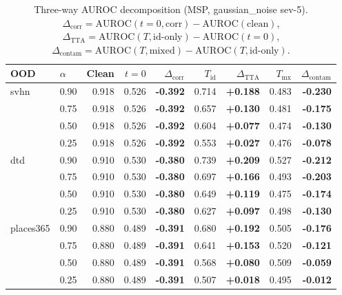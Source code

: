 \begin{table}[t]
\centering
\small
\caption{Three-way AUROC decomposition (MSP, gaussian\_noise sev-5). $\Delta_\text{corr}=\text{AUROC}(t{=}0,\text{corr})-\text{AUROC}(\text{clean})$, $\Delta_\text{TTA}=\text{AUROC}(T,\text{id-only})-\text{AUROC}(t{=}0)$, $\Delta_\text{contam}=\text{AUROC}(T,\text{mixed})-\text{AUROC}(T,\text{id-only})$.}
\label{tab:three_way_decomp}
\begin{tabular}{llrrrrrrr}
\toprule
OOD & $\alpha$ & Clean & $t{=}0$ & $\Delta_\text{corr}$ & $T_\text{id}$ & $\Delta_\text{TTA}$ & $T_\text{mx}$ & $\Delta_\text{contam}$ \\
\midrule
svhn & 0.90 & 0.918 & 0.526 & \textbf{-0.392} & 0.714 & \textbf{+0.188} & 0.483 & \textbf{-0.230} \\
 & 0.75 & 0.918 & 0.526 & \textbf{-0.392} & 0.657 & \textbf{+0.130} & 0.481 & \textbf{-0.175} \\
 & 0.50 & 0.918 & 0.526 & \textbf{-0.392} & 0.604 & \textbf{+0.077} & 0.474 & \textbf{-0.130} \\
 & 0.25 & 0.918 & 0.526 & \textbf{-0.392} & 0.553 & \textbf{+0.027} & 0.476 & \textbf{-0.078} \\
\midrule
dtd & 0.90 & 0.910 & 0.530 & \textbf{-0.380} & 0.739 & \textbf{+0.209} & 0.527 & \textbf{-0.212} \\
 & 0.75 & 0.910 & 0.530 & \textbf{-0.380} & 0.697 & \textbf{+0.166} & 0.493 & \textbf{-0.203} \\
 & 0.50 & 0.910 & 0.530 & \textbf{-0.380} & 0.649 & \textbf{+0.119} & 0.475 & \textbf{-0.174} \\
 & 0.25 & 0.910 & 0.530 & \textbf{-0.380} & 0.627 & \textbf{+0.097} & 0.498 & \textbf{-0.130} \\
\midrule
places365 & 0.90 & 0.880 & 0.489 & \textbf{-0.391} & 0.680 & \textbf{+0.192} & 0.505 & \textbf{-0.176} \\
 & 0.75 & 0.880 & 0.489 & \textbf{-0.391} & 0.641 & \textbf{+0.153} & 0.520 & \textbf{-0.121} \\
 & 0.50 & 0.880 & 0.489 & \textbf{-0.391} & 0.568 & \textbf{+0.080} & 0.509 & \textbf{-0.059} \\
 & 0.25 & 0.880 & 0.489 & \textbf{-0.391} & 0.507 & \textbf{+0.018} & 0.495 & \textbf{-0.012} \\
\bottomrule
\end{tabular}
\end{table}
